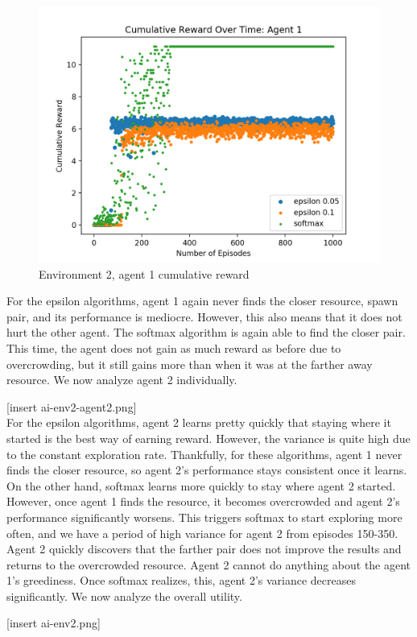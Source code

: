 \documentclass[11pt]{article}
\begin{document}
\begin{figure}[h]
  \centering
  \includegraphics[width=.7\textwidth]{ai-env2-agent1.png}
  \caption{Environment 2, agent 1 cumulative reward}
\end{figure}

For the epsilon algorithms, agent 1 again never finds the closer resource, spawn pair, and its performance is mediocre. However, this also means that it does not hurt the other agent. The softmax algorithm is again able to find the closer pair. This time, the agent does not gain as much reward as before due to overcrowding, but it still gains more than when it was at the farther away resource. We now analyze agent 2 individually.

[insert ai-env2-agent2.png]\\

For the epsilon algorithms, agent 2 learns pretty quickly that staying where it started is the best way of earning reward. However, the variance is quite high due to the constant exploration rate. Thankfully, for these algorithms, agent 1 never finds the closer resource, so agent 2's performance stays consistent once it learns. On the other hand, softmax learns more quickly to stay where agent 2 started. However, once agent 1 finds the resource, it becomes overcrowded and agent 2's performance significantly worsens. This triggers softmax to start exploring more often, and we have a period of high variance for agent 2 from episodes 150-350. Agent 2 quickly discovers that the farther pair does not improve the results and returns to the overcrowded resource. Agent 2 cannot do anything about the agent 1's greediness. Once softmax realizes, this, agent 2's variance decreases significantly. We now analyze the overall utility.

[insert ai-env2.png]\\
\end{document}
